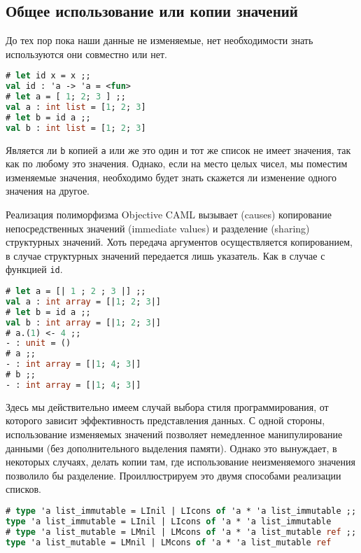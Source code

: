 \subsection{Общее использование или копии значений}
\label{subsec:shared_or_copy_values}

До тех пор пока наши данные не изменяемые, нет необходимости знать используются
они совместно или нет.

\begin{lstlisting}[language=OCaml]
# let id x = x ;;
val id : 'a -> 'a = <fun>
# let a = [ 1; 2; 3 ] ;;
val a : int list = [1; 2; 3]
# let b = id a ;;
val b : int list = [1; 2; 3]
\end{lstlisting}

Является ли \texttt{b} копией \texttt{a} или же это один и тот же список не
имеет значения, так как по любому это  значения. Однако, если
на место целых чисел, мы поместим изменяемые значения, необходимо будет знать
скажется ли изменение одного значения на другое.

Реализация полиморфизма Objective CAML вызывает (causes) копирование
непосредственных значений (immediate values) и разделение (sharing) структурных
значений. Хоть передача аргументов осуществляется копированием, в случае
структурных значений передается лишь указатель. Как в случае с функцией
\texttt{id}.

\begin{lstlisting}[language=OCaml]
# let a = [| 1 ; 2 ; 3 |] ;;
val a : int array = [|1; 2; 3|]
# let b = id a ;;
val b : int array = [|1; 2; 3|]
# a.(1) <- 4 ;;
- : unit = ()
# a ;;
- : int array = [|1; 4; 3|]
# b ;;
- : int array = [|1; 4; 3|]
\end{lstlisting}

Здесь мы действительно имеем случай выбора стиля программирования, от которого
зависит эффективность представления данных. С одной стороны, использование
изменяемых значений позволяет немедленное манипулирование данными (без
дополнительного выделения памяти). Однако это вынуждает, в некоторых случаях,
делать копии там, где использование неизменяемого значения позволило бы
разделение. Проиллюстрируем это двумя способами реализации списков.

\begin{lstlisting}[language=OCaml]
# type 'a list_immutable = LInil | LIcons of 'a * 'a list_immutable ;;
type 'a list_immutable = LInil | LIcons of 'a * 'a list_immutable
# type 'a list_mutable = LMnil | LMcons of 'a * 'a list_mutable ref ;;
type 'a list_mutable = LMnil | LMcons of 'a * 'a list_mutable ref
\end{lstlisting}

